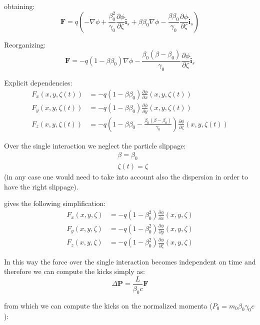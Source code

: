 \documentclass[a4paper,12pt]{report}
\begin{document}
obtaining:
\begin{equation}
\textbf{F} 
=q \left( -\nabla \phi +\frac{\beta_0^2}{\gamma_0}\frac{\partial \phi}{\partial \zeta}\hat{\textbf{i}}_s
 + \beta  \beta_0\nabla \phi - \frac{\beta \beta_0}{\gamma_0} \frac{\partial \phi}{\partial \zeta} \hat{\textbf{i}}_s
  \right)
\end{equation}


Reorganizing:
\begin{equation}
\textbf{F} 
=  -q(1-\beta  \beta_0)\nabla \phi -\frac{\beta_0(\beta-\beta_0)}{\gamma_0}\frac{\partial \phi}{\partial \zeta}\hat{\textbf{i}}_s
\end{equation}

Explicit dependencies:
\begin{align}
F_x(x, y, \zeta(t)) &=  -q(1-\beta  \beta_0) \frac{\partial \phi}{\partial x}(x, y, \zeta(t))\\
F_y(x, y, \zeta(t)) &=  -q(1-\beta  \beta_0) \frac{\partial \phi}{\partial y}(x, y, \zeta(t))\\
F_z(x, y, \zeta(t)) &=  -q\left(1-\beta  \beta_0 -\frac{\beta_0(\beta-\beta_0)}{\gamma_0}\right) \frac{\partial \phi}{\partial \zeta}(x, y, \zeta(t))
\end{align}

Over the single interaction we neglect the particle slippage:
\begin{align}
&\beta = \beta_0\\
&\zeta(t) = \zeta
\end{align}
(in any case one would need to take into account also the dispersion in order to have the right slippage).

gives the following simplification:
\begin{align}
F_x(x, y, \zeta) &=  -q(1-\beta_0^2) \frac{\partial \phi}{\partial x}(x, y, \zeta)\\
F_y(x, y, \zeta) &=  -q(1-\beta_0^2) \frac{\partial \phi}{\partial y}(x, y, \zeta)\\
F_z(x, y, \zeta) &=  -q (1-\beta_0^2) \frac{\partial \phi}{\partial \zeta}(x, y, \zeta)
\end{align}

In this way the force over the single interaction becomes independent on time and therefore we can compute the kicks simply as:
\begin{equation}
\Delta \textbf{P} = \frac{L}{\beta_0 c}\textbf{F} 
\end{equation}

from which we can compute the kicks on the normalized momenta ($P_0=m_0\beta_0\gamma_0c$):
\end{document}
